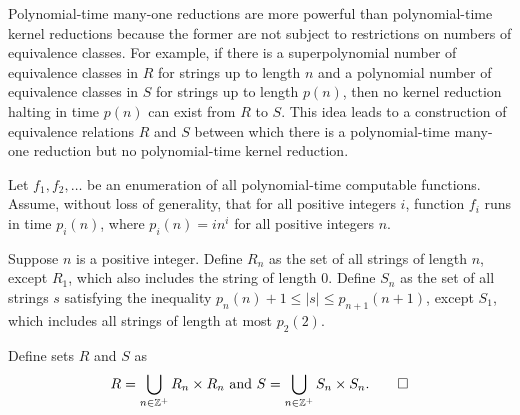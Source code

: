 

Polynomial-time many-one reductions are more powerful than polynomial-time kernel reductions because the former are not subject to restrictions on numbers of equivalence classes. %
For example, if there is a superpolynomial number of equivalence classes in $R$ for strings up to length $n$ and a polynomial number of equivalence classes in $S$ for strings up to length $p(n)$, then no kernel reduction halting in time $p(n)$ can exist from $R$ to $S$.
This idea leads to a construction of equivalence relations $R$ and $S$ between which there is a polynomial-time many-one reduction but no polynomial-time kernel reduction.

\begin{construction}\label{con:rands}
  Let $f_1, f_2, \dotsc$ be an enumeration of all polynomial-time computable functions.
  Assume, without loss of generality, that for all positive integers $i$, function $f_i$ runs in time $p_i(n)$, where $p_i(n) = i n^i$ for all positive integers $n$.

  Suppose $n$ is a positive integer.
  Define $R_n$ as the set of all strings of length $n$, except $R_1$, which also includes the string of length $0$.
  Define $S_n$ as the set of all strings $s$ satisfying the inequality $p_n(n) + 1 \leq |s| \leq p_{n + 1}(n + 1)$, except $S_1$, which includes all strings of length at most $p_2(2)$.

  Define sets $R$ and $S$ as
  \begin{equation*}
    R = \bigcup_{n \in \mathbb{Z}^+} R_n \times R_n \text{ and } S = \bigcup_{n \in \mathbb{Z}^+} S_n \times S_n.\qedhere
  \end{equation*}
\end{construction}

